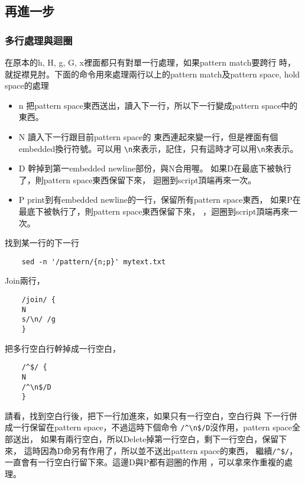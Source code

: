     \subsection{再進一步}
    \subsubsection{多行處理與迴圈}
    在原本的h, H, g, G, x裡面都只有對單一行處理，如果pattern match要跨行
    時，就捉襟見肘。下面的命令用來處理兩行以上的pattern match及pattern
    space, hold space的處理
    \begin{itemize}
    \item n   把pattern space東西送出，讀入下一行，所以下一行變成pattern
              space中的東西。
    \item N   讀入下一行跟目前pattern space的
              東西連起來變一行，但是裡面有個embedded換行符號。可以用
              \verb=\n=來表示，記住，只有這時才可以用\verb=\n=來表示。
    \item D   幹掉到第一embedded newline部份，與N合用喔。
              如果D在最底下被執行了，則pattern space東西保留下來，
              迴圈到script頂端再來一次。
    \item P   print到有embedded newline的一行，保留所有pattern space東西，
              如果P在最底下被執行了，則pattern space東西保留下來，
              ，迴圈到script頂端再來一次。
    \end{itemize}
    找到某一行的下一行
    \begin{verbatim}
    sed -n '/pattern/{n;p}' mytext.txt
    \end{verbatim}
    Join兩行，
    \begin{verbatim}
    /join/ {
    N
    s/\n/ /g
    }
    \end{verbatim}
    把多行空白行幹掉成一行空白，
    \begin{verbatim}
    /^$/ {
    N
    /^\n$/D
    }

    \end{verbatim}
    請看，找到空白行後，把下一行加進來，如果只有一行空白，空白行與
    下一行併成一行保留在pattern space，不過這時下個命令
    \verb=/^\n$/D=沒作用，pattern space全部送出，
    如果有兩行空白，所以Delete掉第一行空白，剩下一行空白，保留下來，
    這時因為D命另有作用了，所以並不送出pattern space的東西，
    繼續\verb=/^$/=，一直會有一行空白行留下來。這邊D與P都有迴圈的作用
    ，可以拿來作重複的處理。

